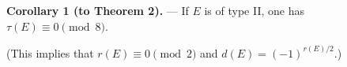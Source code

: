 \textbf{Corollary 1 (to Theorem 2).} — If $E$ is of type II, one has $\tau(E) \equiv 0 \pmod{8}$.

(This implies that $r(E) \equiv 0 \pmod{2}$ and $d(E) = (-1)^{r(E)/2}$.)
